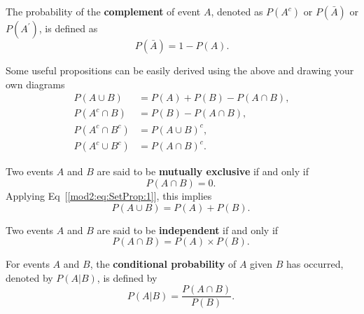 \begin{defn} \label{mod2:defn:Complement}
	The probability of the \textbf{complement} of event $A$, denoted as $P(A^c)$ or $P(\bar{A})$ or $P(A^\prime)$, is defined as
	\begin{equation}
		P(\bar{A}) = 1 - P(A).
	\end{equation}
\end{defn}


\begin{prop} \label{mod2:prop:SetPropositions}
Some useful propositions can be easily derived using the above and drawing your own diagrams
\begin{align}
P(A \cup B) &= P(A) + P(B) - P(A \cap B), \label{mod2:eq:SetProp:1}  \\ 
P(A^c \cap B) &= P(B) - P(A \cap B), \label{mod2:eq:SetProp:2} \\ 
P(A^c \cap B^c) &=  P(A \cup B)^c ,\label{mod2:eq:SetProp:3} \\ 
P(A^c \cup B^c) &= P (A \cap B) ^c .\label{mod2:eq:SetProp:4} \ 
\end{align}
\end{prop}


\begin{defn} \label{mod2:defn:MutuallyExclusive}
Two events $A$ and $B$ are said to be \textbf{mutually exclusive} if and only if
\begin{equation}	
	P ( A \cap B) = 0. \label{mod2:eq:MutuallyExclusive:1} \ 
\end{equation}
Applying Eq~[\ref{mod2:eq:SetProp:1}], this implies 
\begin{equation}
	P(A \cup B) = P(A) + P(B).\  \label{mod2:eq:MutuallyExclusive:2}
\end{equation}
\end{defn}


\begin{defn} \label{mod2:defn:Independent}
Two events $A$ and $B$ are said to be \textbf{independent} if and only if
\begin{equation}
P(A \cap B) = P (A) \times P(B). \label{mod2:eq:Independent} \ 
\end{equation}
\end{defn}

\begin{defn} \label{mod2:defn:Conditional}
For events $A$ and $B$, the \textbf{conditional probability} of $A$ given $B$ has occurred, denoted by $P(A|B)$, is defined by
\begin{equation}
P(A|B) = \frac{P(A\cap B)}{P(B)}. \label{mod2:eq:ConditionalProbability} \ 
\end{equation}
\end{defn}




